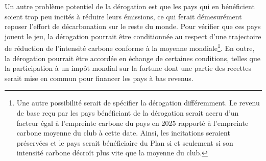 \documentclass[a5paper,french,openany]{memoir}
\begin{document}
Un autre problème potentiel de la dérogation est que les pays qui en bénéficient soient trop peu incités à réduire leurs émissions, ce qui ferait démesurément reposer l'effort de décarbonation sur le reste du monde. Pour vérifier que ces pays jouent le jeu, la dérogation pourrait être conditionnée au respect d'une trajectoire de réduction de l'intensité carbone conforme à la moyenne mondiale\footnote{Une autre possibilité serait de spécifier la dérogation différemment. Le revenu de base reçu par les pays bénéficiant de la dérogation serait accru d'un facteur égal à l'empreinte carbone du pays en 2025 rapporté à l'empreinte carbone moyenne du club à cette date. Ainsi, les incitations seraient préservées et le pays serait bénéficiaire du Plan si et seulement si son intensité carbone décroît plus vite que la moyenne du club.}. 
En outre, la dérogation pourrait être accordée en échange de certaines conditions, telles que la participation à un impôt mondial sur la fortune dont une partie des recettes serait mise en commun pour financer les pays à bas revenus.
\end{document}
